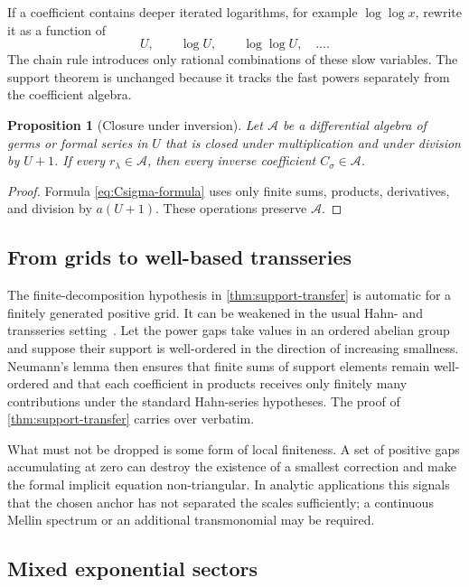 \documentclass[11pt,oneside]{article}
\theoremstyle{plain}
\newtheorem{proposition}[theorem]{Proposition}
\theoremstyle{definition}
\theoremstyle{remark}
\newcommand{\calA}{\mathcal{A}}
\begin{document}
If a coefficient contains deeper iterated logarithms, for example
\(\log\log x\), rewrite it as a function of
\[
 U,
 \qquad \log U,
 \qquad \log\log U,
 \quad\ldots.
\]
The chain rule introduces only rational combinations of these slow variables.
The support theorem is unchanged because it tracks the fast powers separately
from the coefficient algebra.

\begin{proposition}[Closure under inversion]
\label{prop:coefficient-closure}
Let \(\calA\) be a differential algebra of germs or formal series in \(U\)
that is closed under multiplication and under division by \(U+1\).  If every
\(r_\lambda\in\calA\), then every inverse coefficient
\(C_\sigma\in\calA\).
\end{proposition}

\begin{proof}
Formula \eqref{eq:Csigma-formula} uses only finite sums, products,
derivatives, and division by \(a(U+1)\).  These operations preserve
\(\calA\).
\end{proof}

\subsection{From grids to well-based transseries}

The finite-decomposition hypothesis in \cref{thm:support-transfer} is automatic
for a finitely generated positive grid.  It can be weakened in the usual Hahn-
and transseries setting~\cite{vanDerHoeven2006,Edgar2010}.  Let the power
gaps take values in an ordered abelian group and suppose their support is
well-ordered in the direction of increasing smallness.  Neumann's lemma then
ensures that finite sums of support elements remain well-ordered and that each
coefficient in products receives only finitely many contributions under the
standard Hahn-series hypotheses.  The proof of
\cref{thm:support-transfer} carries over verbatim.

What must not be dropped is some form of local finiteness.  A set of positive
gaps accumulating at zero can destroy the existence of a smallest correction
and make the formal implicit equation non-triangular.  In analytic applications
this signals that the chosen anchor has not separated the scales sufficiently;
a continuous Mellin spectrum or an additional transmonomial may be required.

\subsection{Mixed exponential sectors}
\end{document}
